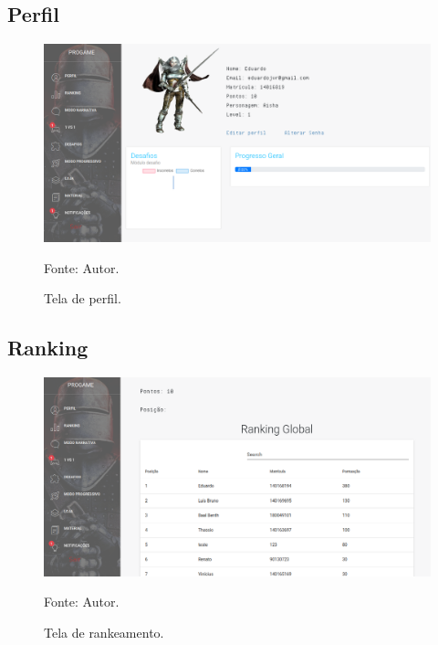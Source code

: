 \subsection{Perfil}
\begin{figure}[h]
	\centering
	\includegraphics[keepaspectratio=true,scale=0.32]{figuras/e.png}
	\caption{Tela de perfil.}
	Fonte: Autor.
	\label{figurae}
\end{figure}

\subsection{Ranking}
\begin{figure}[h]
	\centering
	\includegraphics[keepaspectratio=true,scale=0.32]{figuras/f.png}
	\caption{Tela de rankeamento.}
	Fonte: Autor.
	\label{figuraf}
\end{figure}

\pagebreak


